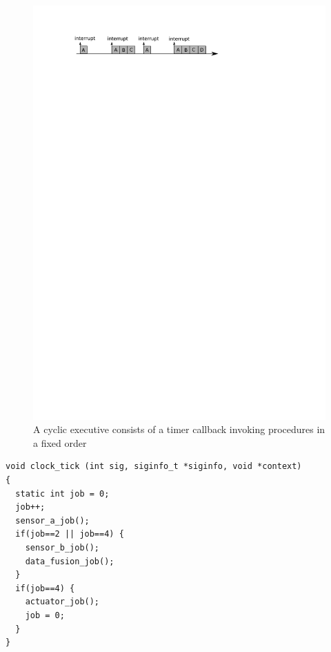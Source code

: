 \begin{figure}
\centering
\includegraphics{figs/cyclic_exec}
\caption{A cyclic executive consists of a timer callback invoking
  procedures in a fixed order}
\label{fig:cyclic_exec}
\end{figure} 

\begin{minipage}{\listingwidth}
\lstset{language=c}
\begin{lstlisting}[label=lst:cyclic_callback, caption=The timer callback
    for a cyclic executive running four separate harmonic tasks]
void clock_tick (int sig, siginfo_t *siginfo, void *context)
{
  static int job = 0;
  job++;
  sensor_a_job();
  if(job==2 || job==4) {
    sensor_b_job();
    data_fusion_job();
  }
  if(job==4) {
    actuator_job();
    job = 0;
  }
}
\end{lstlisting}
\end{minipage}

